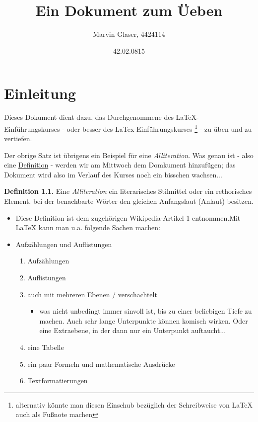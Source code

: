 \documentclass{scrartcl}
\title{Ein Dokument zum Üeben}
\author{Marvin Glaser, 4424114}
\date{42.02.0815}
\begin{document}
 \maketitle
\section{Einleitung}
 Dieses Dokument dient dazu, das Durchgenommene des \LaTeX{}-Einführungskurses - oder besser des \glqq LaTex-Einführungskurses \footnote{alternativ könnte man diesen Einschub bezüglich der Schreibweise von \LaTeX{} auch als Fußnote machen} \grqq - zu üben und zu vertiefen. \par
 Der obrige Satz ist übrigens ein Beispiel für eine {\itshape Alliteration}. Was genau ist - also eine \hyperref[Definition]{Definition} - werden wir am Mittwoch dem Domkument hinzufügen; das Dokument wird also im Verlauf des Kurses noch ein bisschen wachsen...
 \newline
 \newline
 
 \label{Definition}\noindent \textbf{Definition 1.1.} Eine \textit{Alliteration} ein literarisches Stilmittel oder ein rethorisches Ele\-ment, bei der benachbarte Wörter den gleichen Anfangslaut (Anlaut) besitzen.

    
 \begin{itemize}
     
 \item[] Diese Definition ist dem zugehörigen Wikipedia-Artikel 1 %
 entnommen.\newline Mit \LaTeX{} kann man u.a. folgende Sachen machen:
 
 \item Aufzählungen und Auflistungen
        \begin{enumerate}
            \item Aufzählungen
            \item Auflistungen
            \item auch mit mehreren Ebenen / verschachtelt
                \begin{itemize}
                 \item was nicht unbedingt immer sinvoll ist, bis zu einer beliebigen Tiefe zu machen. Auch sehr lange Unterpunkte können komisch wirken. Oder eine Extraebene, in der dann nur ein Unterpunkt auftaucht...
                \end{itemize}
            \item eine Tabelle
            \item ein paar Formeln und mathematische Ausdrücke
            \item Textformatierungen
        \end{enumerate}
 \end{itemize}\par
 
\end{document}
